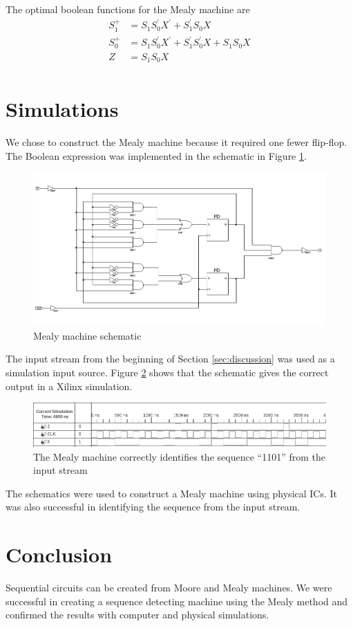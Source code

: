 \documentclass[11pt]{article}
\begin{document}
The optimal boolean functions for the Mealy machine are
\begin{align*}
	S_1^+ &= S_1 S_0^\prime X^\prime + S_1^\prime S_0 X \\
	S_0^+ &= S_1 S_0^\prime X^\prime + S_1^\prime S_0^\prime X + S_1 S_0 X\\
		Z &= S_1 S_0 X\\
\end{align*}

\section{Simulations}

We chose to construct the Mealy machine because it required one fewer flip-flop. The Boolean expression was implemented in the schematic in Figure \ref{fig:schematic}.

\begin{figure}[tbph]
\centering
\includegraphics[width=0.95\linewidth]{graphics/lab6_schematic}
\caption{Mealy machine schematic}
\label{fig:schematic}
\end{figure}

The input stream from the beginning of Section \ref{sec:discussion} was used as a simulation input source. Figure \ref{fig:sim} shows that the schematic gives the correct output in a Xilinx simulation.

\begin{figure}[tbph]
\centering
\includegraphics[width=0.95\linewidth]{graphics/lab6_simulation}
\caption{The Mealy machine correctly identifies the sequence ``1101'' from the input stream}
\label{fig:sim}
\end{figure}

The schematics were used to construct a Mealy machine using physical ICs. It was also successful in identifying the sequence from the input stream.

\section{Conclusion}
Sequential circuits can be created from Moore and Mealy machines. We were successful in creating a sequence detecting machine using the Mealy method and confirmed the results with computer and physical simulations.
\end{document}
